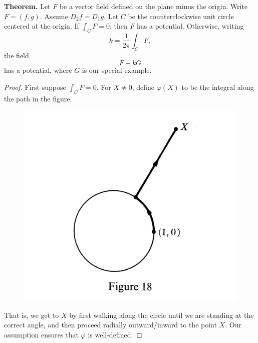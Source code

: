 \documentclass{article}
\begin{document}
\textbf{Theorem.} Let $F$ be a vector field defined on the plane minus the origin.
Write $F = (f,g)$. Assume $D_2 f = D_1 g$. Let $C$ be the counterclockwise unit circle
centered at the origin. If $\int_C F = 0$, then $F$ has a potential. Otherwise,
writing \[k = \frac{1}{2\pi} \int_C F,\]
the field \[F - kG\] has a potential, where $G$ is our special example.
\begin{proof}
    First suppose $\int_C F = 0$. For $X \neq 0$, define $\varphi(X)$ to be 
    the integral along the path in the figure.
    \begin{figure}[h]
        \centering
        \includegraphics[scale = 0.15]{contour.jpeg}
    \end{figure}
    That is, we get to $X$ by first walking along the circle until we 
    are standing at the correct angle, and then proceed radially outward/inward to the point $X$.
    Our assumption ensures that $\varphi$ is well-defined. 
    
\end{proof}
\end{document}
